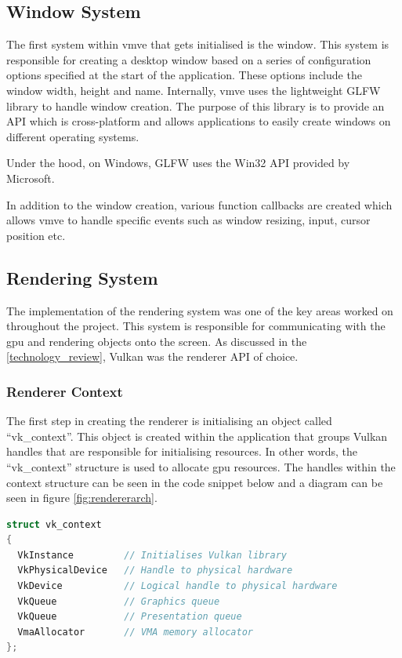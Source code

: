 \documentclass[11pt]{article}
\begin{document}
  

\subsection{Window System}
The first system within \gls*{vmve} that gets initialised is the window. This system is
responsible for creating a desktop window based on a series of configuration
options specified at the start of the application. These options include the
window width, height and name. Internally, \gls*{vmve} uses the lightweight GLFW
library to handle window creation. The purpose of this library is to provide an
API which is cross-platform and allows applications to easily create windows on
different operating systems. 

Under the hood, on Windows, GLFW uses the Win32 API provided by Microsoft.

In addition to the window creation, various function callbacks are created
which allows \gls*{vmve} to handle specific events such as window resizing, input,
cursor position etc.

\subsection{Rendering System}
The implementation of the rendering system was one of the key areas worked on
throughout the project. This system is responsible for communicating with the
\gls*{gpu} and rendering objects onto the screen. As discussed in the
\ref{technology_review}, Vulkan was the renderer API of choice. 

    

\subsubsection{Renderer Context}
The first step in creating the renderer is initialising an object called
``vk\_context''. This object is created within the application that groups Vulkan
handles that are responsible for initialising resources. In other words, the
``vk\_context'' structure is used to allocate \gls*{gpu} resources. The handles
within the context structure can be seen in the code snippet below and a diagram
can be seen in figure \ref{fig:rendererarch}.

\begin{lstlisting}[language=C++]
struct vk_context
{
  VkInstance         // Initialises Vulkan library
  VkPhysicalDevice   // Handle to physical hardware
  VkDevice           // Logical handle to physical hardware
  VkQueue            // Graphics queue
  VkQueue            // Presentation queue
  VmaAllocator       // VMA memory allocator
};
\end{lstlisting}
\end{document}
